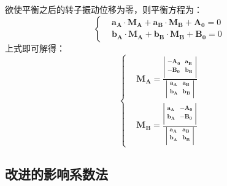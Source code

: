 \documentclass[
  lang=cn,
  degree=master,
  openany,oneside
]{nuaathesis}
\begin{document}
欲使平衡之后的转子振动位移为零，则平衡方程为：
\begin{equation}
\left\{
\begin{aligned}
&	{\boldsymbol{a_A}}\cdot{\boldsymbol{M_A}} + {\boldsymbol{a_B}}\cdot{\boldsymbol{M_B}} + {\boldsymbol{A_0}} = 0 \\
&	{\boldsymbol{b_A}}\cdot{\boldsymbol{M_A}} + {\boldsymbol{b_B}}\cdot{\boldsymbol{M_B}} + {\boldsymbol{B_0}} = 0
\end{aligned}
\right.
\end{equation}
上式即可解得：
\begin{equation}
\label{eq:4-coff_m}
\left\{
\begin{aligned}
&{\boldsymbol{M_A}} = \frac{\left|\begin{array}{ccc} 
   -{\boldsymbol{A_0}} &  {\boldsymbol{a_B}}  \\ 
   -{\boldsymbol{B_0}} &  {\boldsymbol{b_B}} \\ 
\end{array}\right| }{\left|\begin{array}{ccc} 
   {\boldsymbol{a_A}} &  {\boldsymbol{a_B}}  \\ 
   {\boldsymbol{b_A}} &  {\boldsymbol{b_B}} \\ 
\end{array}\right| } \\
&{\boldsymbol{M_B}} = \frac{\left|\begin{array}{ccc} 
   {\boldsymbol{a_A}} &  -{\boldsymbol{A_0}}  \\ 
   {\boldsymbol{b_A}} &  -{\boldsymbol{B_0}} \\ 
\end{array}\right| }{\left|\begin{array}{ccc} 
   {\boldsymbol{a_A}} &  {\boldsymbol{a_B}}  \\ 
   {\boldsymbol{b_A}} &  {\boldsymbol{b_B}} \\ 
\end{array}\right| }	
\end{aligned}
\right.
\end{equation}

\subsection{改进的影响系数法}
\end{document}
